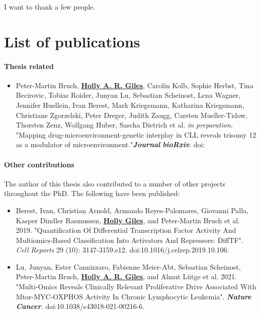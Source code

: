\documentclass[11pt, a4paper, twosided]{book}
\begin{document}
I want to thank a few people.
\newpage\null\newpage


    \hypertarget{list-of-publications}{%
    \chapter*{List of publications}\label{list-of-publications}}

    \hypertarget{thesis-related}{%
    \subsubsection*{Thesis related}\label{thesis-related}}
    \begin{itemize}
        \item  Peter-Martin Bruch\ast,  \textbf{\underline{Holly A. R. Giles}}\ast, Carolin Kolb, Sophie Herbst, Tina Becirovic, Tobias Roider, Junyan Lu, Sebastian Scheinost, Lena Wagner, Jennifer Huellein, Ivan Berest, Mark Kriegsmann, Katharina Kriegsmann, Christiane Zgorzelski, Peter Dreger, Judith Zaugg, Carsten Mueller-Tidow, Thorsten Zenz, Wolfgang Huber, Sascha Dietrich et al. \textit{in preparation.}  "Mapping drug-microenvironment-genetic interplay in CLL reveals trisomy 12 as a modulator of microenvironment."\textbf{\textit{Journal}} \textbf{\textit{bioRxiv}}. doi:
    \end{itemize}
    \hypertarget{other-contributions}{%
    \subsubsection*{Other contributions}\label{other-contributions}}

    The author of this thesis also contributed to a number of other projects throughout the PhD. The following have been published:
    \begin{itemize}
        \item Berest, Ivan\ast, Christian Arnold\ast, Armando Reyes-Palomares, Giovanni Palla, Kasper Dindler Rasmussen, \textbf{\underline{Holly Giles}}, and Peter-Martin Bruch et al. 2019. "Quantification Of Differential Transcription Factor Activity And Multiomics-Based Classification Into Activators And Repressors: DiffTF". \textit{Cell Reports} 29 (10): 3147-3159.e12. doi:10.1016/j.celrep.2019.10.106.
        
      \item Lu, Junyan\ast, Ester Cannizzaro\ast, Fabienne Meier-Abt, Sebastian Scheinost, Peter-Martin Bruch, \textbf{\underline{Holly A. R. Giles}}, and Almut Lütge et al. 2021. "Multi-Omics Reveals Clinically Relevant Proliferative Drive Associated With Mtor-MYC-OXPHOS Activity In Chronic Lymphocytic Leukemia". \textbf{\textit{Nature Cancer}}. doi:10.1038/s43018-021-00216-6.
    \end{itemize}
\newpage\null\newpage
\end{document}
